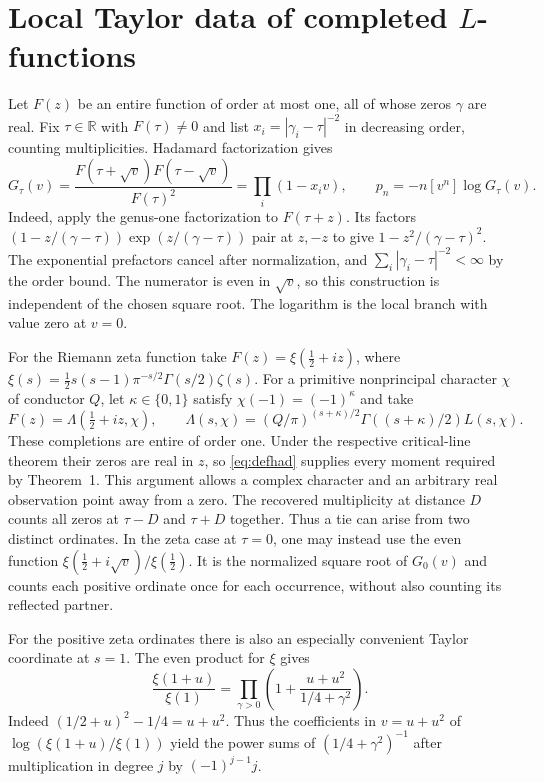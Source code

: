 \documentclass[11pt]{article}
\begin{document}
\section{Local Taylor data of completed $L$-functions}

Let $F(z)$ be an entire function of order at most one, all of whose zeros
$\gamma$ are real. Fix $\tau\in\mathbb R$ with $F(\tau)\ne0$ and list
$x_i=|\gamma_i-\tau|^{-2}$ in decreasing order, counting multiplicities.
Hadamard factorization gives
\begin{equation}\label{eq:defhad}
    G_{\tau}(v)=
    \frac{F(\tau+\sqrt v)F(\tau-\sqrt v)}{F(\tau)^2}
          =\prod_i(1-x_i v),\qquad
    p_n=-n[v^n]\log G_{\tau}(v).
\end{equation}
Indeed, apply the genus-one factorization to $F(\tau+z)$. Its factors
$(1-z/(\gamma-\tau))\exp(z/(\gamma-\tau))$ pair at $z,-z$ to give
$1-z^2/(\gamma-\tau)^2$. The exponential prefactors cancel after
normalization, and $\sum_i|\gamma_i-\tau|^{-2}<\infty$ by the order bound.
The numerator is even in $\sqrt v$, so this construction is independent
of the chosen square root. The logarithm is the local branch with value zero
at $v=0$.

For the Riemann zeta function take
$F(z)=\xi(\tfrac12+iz)$, where
$\xi(s)=\tfrac12s(s-1)\pi^{-s/2}\Gamma(s/2)\zeta(s)$.
For a primitive nonprincipal character $\chi$ of conductor $Q$, let
$\kappa\in\{0,1\}$ satisfy $\chi(-1)=(-1)^\kappa$ and take
\[
 F(z)=\Lambda(\tfrac12+iz,\chi),\qquad
 \Lambda(s,\chi)=
       (Q/\pi)^{(s+\kappa)/2}\Gamma((s+\kappa)/2)L(s,\chi).
\]
These completions are entire of order one. Under the respective critical-line
theorem their zeros are real in $z$, so \eqref{eq:defhad} supplies every
moment required by Theorem~1. This argument allows a complex character and an
arbitrary real observation point away from a zero. The recovered multiplicity at
distance $D$ counts all zeros at $\tau-D$ and $\tau+D$ together. Thus a tie
can arise from two distinct ordinates. In the zeta case at $\tau=0$, one may
instead use the even function $\xi(\tfrac12+i\sqrt v)/\xi(\tfrac12)$.
It is the normalized square root of $G_0(v)$ and counts each positive ordinate
once for each occurrence, without also counting its reflected partner.

For the positive zeta ordinates there is also an especially convenient
Taylor coordinate at $s=1$. The even product for $\xi$ gives
\[
 \frac{\xi(1+u)}{\xi(1)}
 =\prod_{\gamma>0}\left(1+\frac{u+u^2}{1/4+\gamma^2}\right).
\]
Indeed $(1/2+u)^2-1/4=u+u^2$. Thus the coefficients in $v=u+u^2$ of
$\log(\xi(1+u)/\xi(1))$ yield the power sums of $(1/4+\gamma^2)^{-1}$
after multiplication in degree $j$ by $(-1)^{j-1}j$.
\end{document}
